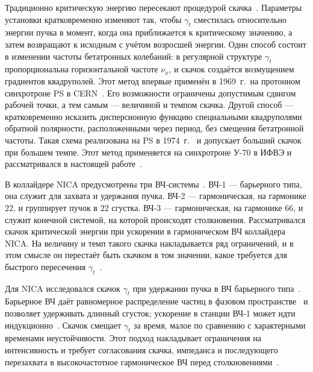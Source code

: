 Традиционно критическую энергию пересекают процедурой скачка~\cite{Risselada:1992_jump}. Параметры установки кратковременно изменяют так, чтобы $\gamma_t$ сместилась относительно энергии пучка в момент, когда она приближается к критическому значению, а затем возвращают к исходным с учётом возросшей энергии. Один способ состоит в изменении частоты бетатронных колебаний: в регулярной структуре $\gamma_t$ пропорциональна горизонтальной частоте $\nu_x$, и скачок создаётся возмущением градиентов квадруполей. Этот метод впервые применён в 1969~г.\ на протонном синхротроне PS в CERN~\cite{Mohl:1969_qjump}. Его возможности ограничены допустимым сдвигом рабочей точки, а тем самым --- величиной и темпом скачка. Другой способ --- кратковременно исказить дисперсионную функцию специальными квадруполями обратной полярности, расположенными через период, без смещения бетатронной частоты. Такая схема реализована на PS в 1974~г.~\cite{Hardt:1975_cps_jump} и допускает больший скачок при большем темпе. Этот метод применяется на синхротроне У-70 в ИФВЭ и рассматривался в настоящей работе~\cite{Kolokolchikov:2024_u70}.

В коллайдере NICA предусмотрены три ВЧ-системы~\cite{Malyshev:2021_bb,Kolokolchikov:2024_nica_rf}. ВЧ-1 --- барьерного типа, она служит для захвата и удержания пучка. ВЧ-2 --- гармоническая, на гармонике $22$, и группирует пучок в $22$ сгустка. ВЧ-3 --- гармоническая, на гармонике $66$, и служит конечной системой, на которой происходят столкновения. Рассматривался скачок критической энергии при ускорении в гармоническом ВЧ коллайдера NICA. На величину и темп такого скачка накладывается ряд ограничений, и в этом смысле он перестаёт быть скачком в том значении, какое требуется для быстрого пересечения $\gamma_t$~\cite{Kolokolchikov:2024_nica_rf,Kolokolchikov:2024_u70}.

Для NICA исследовался скачок $\gamma_t$ при удержании пучка в ВЧ барьерного типа~\cite{Kolokolchikov:2023_bb_ipac,Kolokolchikov:2024_dspin,Kolokolchikov:2024_bb_impedance,Kolokolchikov:2024_nica_rf}. Барьерное ВЧ даёт равномерное распределение частиц в фазовом пространстве~\cite{Stockhorst:2016_cooling} и позволяет удерживать длинный сгусток; ускорение в станции ВЧ-1 может идти индукционно~\cite{Malyshev:2021_bb}. Скачок смещает $\gamma_t$ за время, малое по сравнению с характерными временами неустойчивости. Этот подход накладывает ограничения на интенсивность и требует согласования скачка, импеданса и последующего перезахвата в высокочастотное гармоническое ВЧ перед столкновениями~\cite{Kolokolchikov:2024_nica_rf,Zenkevich:2020_itep,Syresin:2021_polarized}.


